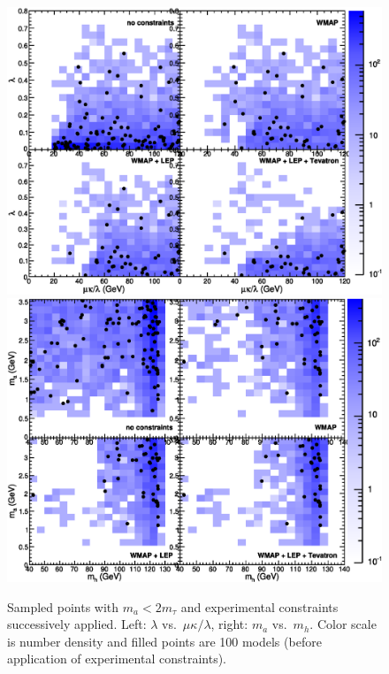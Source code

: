 \documentclass[aps,prl,twocolumn,nofootinbib,superscriptaddress]{revtex4}
\begin{document}
\begin{figure}
\includegraphics[width=0.48\linewidth]{plots/newbranching/fourconstraints_params.eps}
\includegraphics[width=0.48\linewidth]{plots/newbranching/fourconstraints_masses.eps}

\caption{Sampled points with $m_a < 2m_\tau$ and experimental constraints successively applied.  Left: $\lambda$ vs.\ $\mu\kappa/\lambda$, right: $m_a$ vs.\ $m_h$.  Color scale is number density and filled points are 100 models (before application of experimental constraints). \label{fig:exclusion}}
\end{figure}


\end{document}
